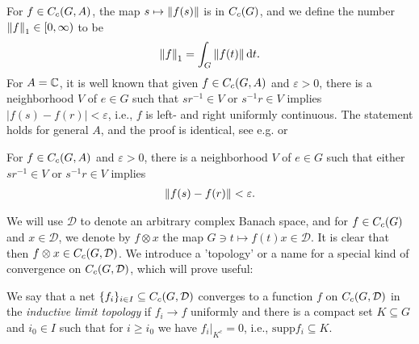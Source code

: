 For $f \in C_c(G,A)$, the map $s \mapsto \left\lVert f(s) \right\rVert$ is in $C_c(G)$, and we define the number $\left\lVert f \right\rVert_1 \in [0,\infty)$ to be
\begin{align*}
	\left\lVert f \right\rVert_1 = \int_G \left\lVert f(t) \right\rVert \mathrm{d} t.
\end{align*}
For $A= \mathbb{C}$, it is well known that given $f \in C_c(G,A)$ and $\varepsilon > 0$, there is a neighborhood $V$ of $e \in G$ such that $sr^{-1} \in V$ or $s^{-1}r \in V$ implies $| f(s) - f(r)| < \varepsilon$, i.e., $f$ is left- and right uniformly continuous. The statement holds for general $A$, and the proof is identical, see e.g. \cite[Proposition 2.6]{folland2016fourier} or \cite[Lemma 1.88]{williamscrossed}
\begin{lemma}
	For $f \in C_c(G,A)$ and $\varepsilon>0$, there is a neighborhood $V$ of $e \in G$ such that either $sr^{-1} \in V$ or $s^{-1}r \in V$ implies
	\begin{align*}
		\left\lVert f(s)  - f(r) \right\rVert < \varepsilon.
	\end{align*}
	\label{int:lrunicont}
\end{lemma}

We will use $\mathcal{D}$ to denote an arbitrary complex Banach space, and for $f \in C_c(G)$ and $x \in \mathcal{D}$, we denote by $f \otimes x$ the map $G \ni t \mapsto f(t)x \in \mathcal{D}$. It is clear that then $f \otimes x \in C_c(G,\mathcal{D})$. We introduce a 'topology' or a name for a special kind of convergence on $C_c(G,\mathcal{D})$, which will prove useful:
\begin{definition}
	We say that a net $\{f_i\}_{i \in I} \subseteq C_c(G,\mathcal{D})$ converges to a function $f$ on $C_c(G,\mathcal{D})$ in the \emph{inductive limit topology} if $f_i \to f$ uniformly and there is a compact set $K \subseteq G$ and $i_0 \in I$ such that for $i \geq i_0$ we have $f_i \big|_{K^c} = 0$, i.e., $\mathrm{supp} f_i \subseteq K$.
\end{definition}

